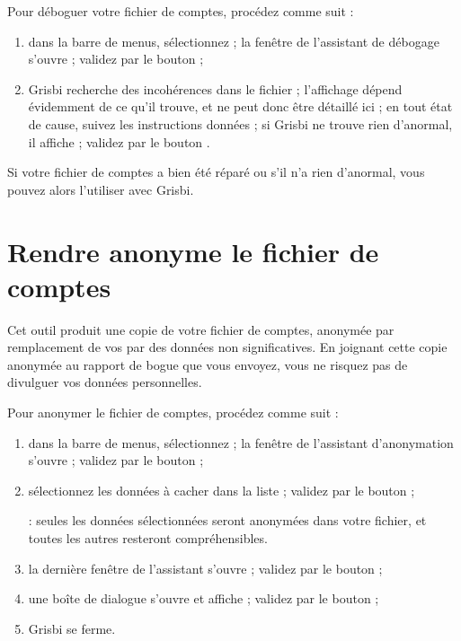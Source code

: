 Pour déboguer votre fichier de comptes, procédez comme suit :

\begin{enumerate}
	\item dans la barre de menus, sélectionnez  ; la fenêtre de l'assistant de débogage s'ouvre ; validez par le bouton  ;
	\item Grisbi recherche des incohérences dans le fichier ; l'affichage dépend évidemment de ce qu'il trouve, et ne peut donc être détaillé ici ; en tout état de cause, suivez les instructions données ; si Grisbi ne trouve rien d'anormal, il affiche  ; validez par le bouton .
\end{enumerate}

Si votre fichier de comptes a bien été réparé ou s'il n'a rien d'anormal, vous pouvez alors l'utiliser avec Grisbi.

\newpage


\section{Rendre anonyme le fichier de comptes\label{maintenance-file-anonymous}}

Cet outil produit une copie de votre fichier de comptes, anonymée par remplacement de vos  par des données non significatives. En joignant cette copie anonymée au rapport de bogue que vous envoyez, vous ne risquez pas de divulguer vos données personnelles.

Pour anonymer le fichier de comptes, procédez comme suit :

\begin{enumerate}
	\item dans la barre de menus, sélectionnez  ; la fenêtre de l'assistant d'anonymation s'ouvre ; validez par le bouton  ;
	\item sélectionnez les données à cacher dans la liste ; validez par le bouton  ;

 : seules les données sélectionnées seront anonymées dans votre fichier, et toutes les autres resteront compréhensibles.

	\item la dernière fenêtre de l'assistant s'ouvre ; validez par le bouton  ;
	\item une boîte de dialogue s'ouvre et affiche  ; validez par le bouton  ;
	\item Grisbi se ferme.
\end{enumerate}


